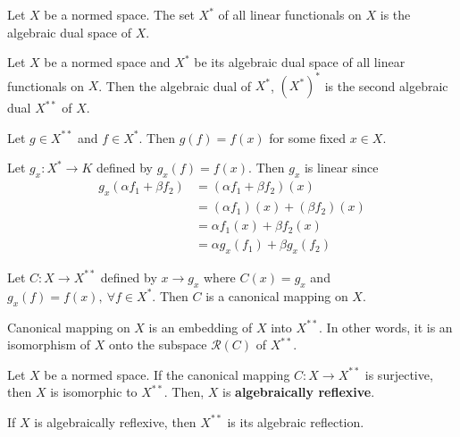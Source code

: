 \begin{definition}
	Let $X$ be a normed space.
	The set $X^\ast$ of all linear functionals on $X$ is the algebraic dual space of $X$.
\end{definition}

\begin{definition}
	Let $X$ be a normed space and $X^\ast$ be its algebraic dual space of all linear functionals on $X$.
	Then the algebraic dual of $X^\ast$, $(X^\ast)^\ast$ is the second algebraic dual $X^{\ast\ast}$ of $X$.
\end{definition}

\begin{important}
\begin{remark}
	Let $g \in X^{\ast\ast}$ and $f \in X^\ast$.
	Then $g(f) = f(x)$ for some fixed $x \in X$.
\end{remark}
\end{important}

\begin{remark}
	Let $g_x : X^\ast \to K$ defined by $g_x(f) = f(x)$.
	Then $g_x$ is linear since
	\begin{align*}
		g_x(\alpha f_1 + \beta f_2) 
		& = (\alpha f_1 + \beta f_2)(x) \\
		& = (\alpha f_1)(x) + (\beta f_2)(x) \\
		& = \alpha f_1(x) + \beta f_2(x) \\
		& = \alpha g_x(f_1) + \beta g_x(f_2)
	\end{align*}
\end{remark}
\begin{definition}
	Let $C : X \to X^{\ast\ast}$ defined by $x \to g_x$ where $C(x) = g_x$ and $g_x(f) = f(x),\ \forall f \in X^\ast$.
	Then $C$ is a canonical mapping on $X$.
\end{definition}
\begin{remark}
	Canonical mapping on $X$ is an embedding of $X$ into $X^{\ast\ast}$. In other words, it is an isomorphism of $X$ onto  the subspace $\mathcal{R}(C)$ of $X^{\ast\ast}$.
\end{remark}
\begin{definition}
	Let $X$ be a normed space.
	If the canonical mapping $C : X \to X^{\ast\ast}$ is surjective, then $X$ is isomorphic to $X^{\ast\ast}$.
	Then, $X$ is \textbf{algebraically reflexive}.
\end{definition}

\begin{remark}
	If $X$ is algebraically reflexive, then $X^{\ast\ast}$ is its algebraic reflection.
\end{remark}


